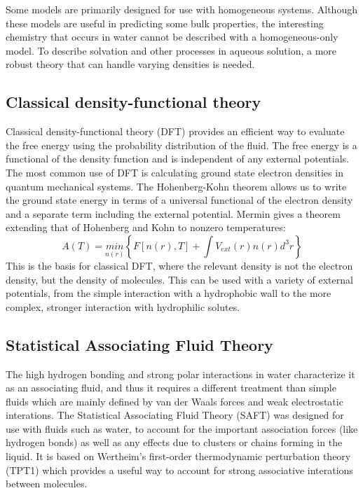 \documentclass[letterpaper,twocolumn,amsmath,amssymb,prb]{revtex4-1}
\begin{document}
Some models are primarily designed for use with homogeneous systems. Although
these 
models are useful in predicting some bulk properties, the interesting
chemistry that occurs in water cannot be described with a homogeneous-only
model. To
describe solvation and other processes in aqueous solution, a more robust theory
that 
can handle varying densities is needed.

\subsection{Classical density-functional theory}

Classical density-functional theory (DFT) provides an efficient way to evaluate
the free energy using the probability distribution of the fluid. The free energy 
is a functional
of the density function and is independent of any external
potentials\cite{ebner1976}. The most common use of DFT is calculating ground
state electron densities in quantum mechanical systems. The Hohenberg-Kohn
theorem\cite{hohenberg1964inhomogeneous} allows us to write the ground state
energy in terms of a universal functional of the electron density and a separate
term including the external potential. Mermin\cite{mermin1965thermal} gives a
theorem extending that of Hohenberg and Kohn to nonzero temperatures:
\begin{equation}
  A(T) = \underset{n(r)}{min}\left\{ F[n(r),T] + \int V_{ext}(r) n(r)
d^3r\right\}
\end{equation}
This is the basis for classical DFT, where the relevant density is not the
electron density,
but the density of molecules. This can be used with a variety of 
external potentials, from the simple interaction with a 
hydrophobic wall to the more complex, stronger interaction with hydrophilic
solutes.

\subsection{Statistical Associating Fluid Theory}

The high hydrogen bonding and strong polar interactions in water characterize it
as an associating fluid, and thus it requires a different treatment than simple
fluids which are mainly defined by van der Waals forces and weak electrostatic
interations. The Statistical Associating Fluid Theory (SAFT) was designed for
use with fluids such as water, to account for the important association forces
(like hydrogen bonds) as well as any effects due to clusters or chains forming
in the liquid\cite{muller2001molecular}. It is based on Wertheim's first-order
thermodynamic perturbation theory (TPT1)
\cite{wertheim1984fluidsI,wertheim1984fluidsII,wertheim1986fluidsIII,
wertheim1986fluidsIV} which provides a useful way to account for strong
associative interations between molecules.
\end{document}
